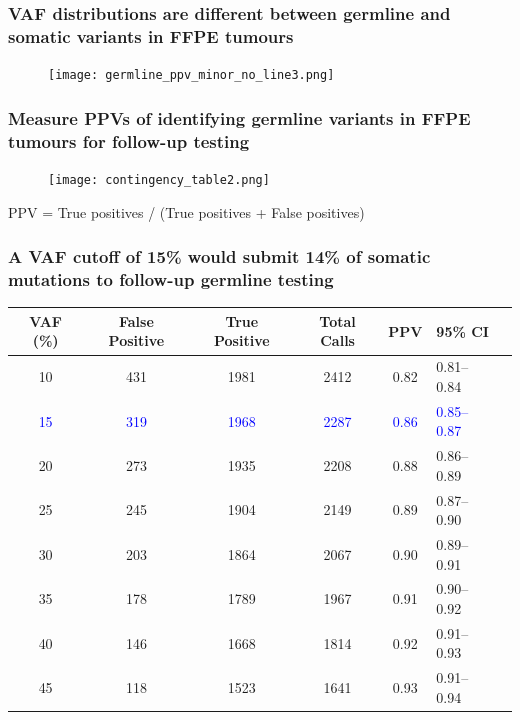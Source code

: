 \documentclass{beamer}
\begin{document}
\begin{frame}
\frametitle{VAF distributions are different between germline and somatic variants in FFPE tumours}
\begin{figure}[t]
    \texttt{[image: germline\_ppv\_minor\_no\_line3.png]}
\end{figure}
\end{frame}

\begin{frame}
\frametitle{Measure PPVs of identifying germline variants in FFPE tumours for follow-up testing}
\begin{figure}[t]
    \texttt{[image: contingency\_table2.png]}
\end{figure}
\vspace{-2mm}
\centering
PPV = True positives / (True positives + False positives)
\end{frame}

\begin{frame}
\frametitle{A VAF cutoff of 15\% would submit 14\% of somatic mutations to follow-up germline testing}
\scriptsize
\begin{table}[H]
\centering
      \begin{tabular}{cccccll}
        \hline
        VAF (\%) & False Positive & True Positive & Total Calls & PPV & 95\% CI
        \\
        \hline
        10 & 431 & 1981 & 2412 & 0.82 & 0.81--0.84
        \\
        \textcolor{blue}{15} & \textcolor{blue}{319} & \textcolor{blue}{1968} & \textcolor{blue}{2287} & \textcolor{blue}{0.86} & \textcolor{blue}{0.85--0.87}
        \\
        20 & 273 & 1935 & 2208 & 0.88 & 0.86--0.89
        \\
        25 & 245 & 1904 & 2149 & 0.89 & 0.87--0.90
        \\
        30 & 203 & 1864 & 2067 & 0.90 & 0.89--0.91
        \\
        35 & 178 & 1789 & 1967 & 0.91 & 0.90--0.92
        \\
        40 & 146 & 1668 & 1814 & 0.92 & 0.91--0.93
        \\
        45 & 118 & 1523 & 1641 & 0.93 & 0.91--0.94
        \\
				\hline
      \end{tabular} \\
\end{table}
\end{frame}

\end{document}
